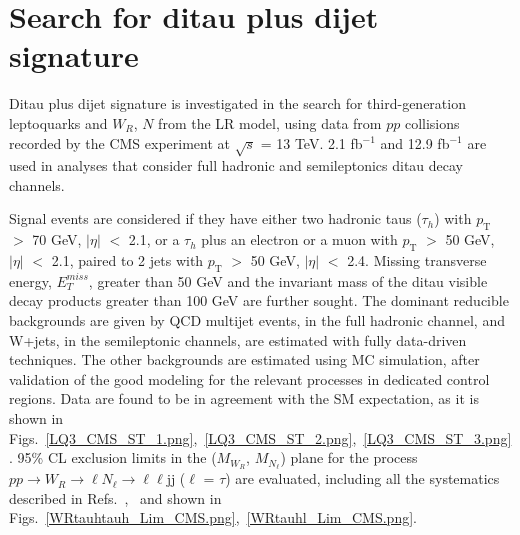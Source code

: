 \documentclass[10pt]{article}
\begin{document}
\vspace{-1.cm}
\section{Search for ditau plus dijet signature}
\vspace{-0.15cm}
Ditau plus dijet signature is investigated in the search for third-generation leptoquarks and $W_R$, $N$ from the LR model,
using data from $pp$ collisions recorded by the CMS experiment at $\sqrt{s}$ = 13 TeV.
2.1 fb$^{-1}$ \cite{LQ3015_CMS} and 12.9 fb$^{-1}$ \cite{LQ3016_CMS} are used in analyses that consider full hadronic and semileptonics ditau decay channels.

Signal events are considered if they have either two hadronic taus ($\tau_h$) with $p_\mathrm{T}$ $>$ 70 GeV, $|\eta|$ $<$ 2.1, or a $\tau_h$ plus an electron or a muon with $p_\mathrm{T}$ $>$ 50 GeV, $|\eta|$ $<$ 2.1,
paired to 2 jets with $p_\mathrm{T}$ $>$ 50 GeV, $|\eta|$ $<$ 2.4.
Missing transverse energy, $E^{miss}_{T}$, greater than 50 GeV and the invariant mass of the ditau visible decay products greater than 100 GeV are further sought. 
The dominant reducible backgrounds are given by QCD multijet events, in the full hadronic channel, and W+jets, in the semileptonic channels, are estimated with fully data-driven techniques. 
The other backgrounds are estimated using MC simulation, after validation of the good modeling for the relevant processes in dedicated control regions.
Data are found to be in agreement with the SM expectation, as it is shown in Figs.~\ref{LQ3_CMS_ST_1.png},~\ref{LQ3_CMS_ST_2.png},~\ref{LQ3_CMS_ST_3.png}.
95\% CL exclusion limits in the ($M_{W_R}$, $M_{N_{\ell}}$) plane for the process $pp \rightarrow W_R \rightarrow \ell N_{\ell} \rightarrow \ell \ell$jj ($\ell$ = $\tau$) are evaluated,
including all the systematics described in Refs.~\cite{LQ3015_CMS},~\cite{LQ3016_CMS} and shown in Figs.~\ref{WRtauhtauh_Lim_CMS.png},~\ref{WRtauhl_Lim_CMS.png}.
\end{document}
